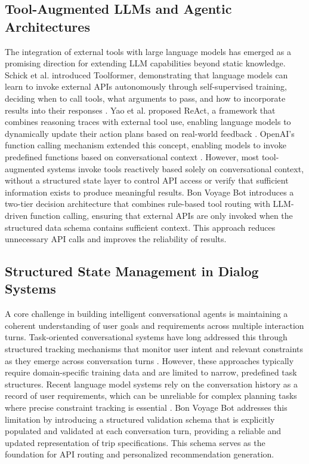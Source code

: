 \documentclass{article}
\begin{document}
\subsection{Tool-Augmented LLMs and Agentic Architectures}
The integration of external tools with large language models has emerged as a promising direction for extending LLM capabilities beyond static knowledge. Schick et al. introduced Toolformer, demonstrating that language models can learn to invoke external APIs autonomously through self-supervised training, deciding when to call tools, what arguments to pass, and how to incorporate results into their responses \citep{schick2023toolformer}. Yao et al. proposed ReAct, a framework that combines reasoning traces with external tool use, enabling language models to dynamically update their action plans based on real-world feedback \citep{yao2023react}. OpenAI's function calling mechanism extended this concept, enabling models to invoke predefined functions based on conversational context \citep{openai2023gpt4}. However, most tool-augmented systems invoke tools reactively based solely on conversational context, without a structured state layer to control API access or verify that sufficient information exists to produce meaningful results. Bon Voyage Bot introduces a two-tier decision architecture that combines rule-based tool routing with LLM-driven function calling, ensuring that external APIs are only invoked when the structured data schema contains sufficient context. This approach reduces unnecessary API calls and improves the reliability of results.

\subsection{Structured State Management in Dialog Systems}
A core challenge in building intelligent conversational agents is maintaining a coherent understanding of user goals and requirements across multiple interaction turns. Task-oriented conversational systems have long addressed this through structured tracking mechanisms that monitor user intent and relevant constraints as they emerge across conversation turns \citep{wang2023survey}. However, these approaches typically require domain-specific training data and are limited to narrow, predefined task structures. Recent language model systems rely on the conversation history as a record of user requirements, which can be unreliable for complex planning tasks where precise constraint tracking is essential \citep{xie2024travelplanner}. Bon Voyage Bot addresses this limitation by introducing a structured validation schema that is explicitly populated and validated at each conversation turn, providing a reliable and updated representation of trip specifications. This schema serves as the foundation for API routing and personalized recommendation generation. 
\end{document}
